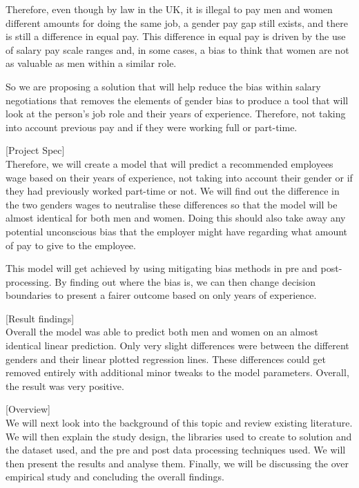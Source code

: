 \documentclass{sigchi}
\begin{document}
	Therefore, even though by law in the UK, it is illegal to pay men and women different amounts for doing the same job, a gender pay gap still exists, and there is still a difference in equal pay. This difference in equal pay is driven by the use of salary pay scale ranges and, in some cases, a bias to think that women are not as valuable as men within a similar role.
	
	So we are proposing a solution that will help reduce the bias within salary negotiations that removes the elements of gender bias to produce a tool that will look at the person's job role and their years of experience. Therefore, not taking into account previous pay and if they were working full or part-time.

[Project Spec]\\ %
	Therefore, we will create a model that will predict a recommended employees wage based on their years of experience, not taking into account their gender or if they had previously worked part-time or not. We will find out the difference in the two genders wages to neutralise these differences so that the model will be almost identical for both men and women. Doing this should also take away any potential unconscious bias that the employer might have regarding what amount of pay to give to the employee.
	
	This model will get achieved by using mitigating bias methods in pre and post-processing. By finding out where the bias is, we can then change decision boundaries to present a fairer outcome based on only years of experience.

[Result findings]\\
	Overall the model was able to predict both men and women on an almost identical linear prediction. Only very slight differences were between the different genders and their linear plotted regression lines. These differences could get removed entirely with additional minor tweaks to the model parameters. Overall, the result was very positive.

[Overview]\\
	We will next look into the background of this topic and review existing literature. We will then explain the study design, the libraries used to create to solution and the dataset used, and the pre and post data processing techniques used. We will then present the results and analyse them. Finally, we will be discussing the over empirical study and concluding the overall findings.
\end{document}
